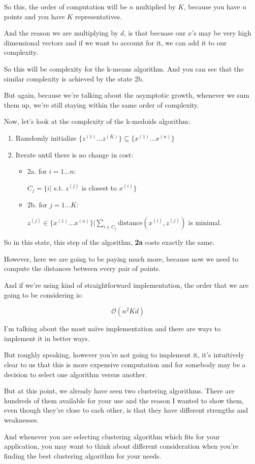 \documentclass[a4paper, 12pt]{article}
\begin{document}
So this, the order of computation will be \(n\) multiplied by \(K\), because you
have \(n\) points and you have \(K\) representatives.

And the reason we are multiplying by \(d\), is that becuase our \(x\)’s may be
very high dimensional vectors and if we want to account for it, we can add it to
our complexity.

So this will be complexity for the k-means algorithm. And you can see that the
similar complexity is achieved by the state 2b.

But again, because we're talking about the asymptotic growth, whenever we sum
them up, we're still staying within the same order of complexity.

Now, let's look at the complexity of the k-medoids algorithm:

\begin{enumerate}
\item Ramdomly initialize \(\{z^{(1)} \ldots z^{(K)}\} \subseteq \{x^{(1)} \ldots x^{(n)}\}\)
\item Iterate until there is no change in cost:
\begin{itemize}
\item 2a. for \(i=1 \ldots n\):

\(C_j = \{i|\) s.t. \(z^{(j)}\) is closest to \(x^{(i)}\}\)

\item 2b. for \(j=1 \ldots K\):

\(z^{(j)} \in \{x^{(1)} \ldots x^{(n)}\} | \sum_{i \in C_j} \text{distance}(x^{(i)}, z^{(j)})\) is minimal.
\end{itemize}
\end{enumerate}


So in this state, this step of the algorithm, \textbf{2a} costs exactly the same.

However, here we are going to be paying much more, because now we need to
compute the distances between every pair of points.

And if we're using kind of straightforward implementation, the order that we are
going to be considering is:

\begin{equation}
\mathcal{O}(n^{2}Kd)
\end{equation}

I'm talking about the most naïve implementation and there are ways to
implement it in better ways.

But roughly speaking, however you're not going to implement it, it's intuitively
clear to us that this is more expensive computation and for somebody may be a
decision to select one algorithm versus another.

But at this point, we already have seen two clustering algorithms. There are
hundreds of them available for your use and the reason I wanted to show them,
even though they're close to each other, is that they have different strengths
and weaknesses.

And whenever you are selecting clustering algorithm which fits for your
application, you may want to think about different consideration when you're
finding the best clustering algorithm for your needs.
\end{document}
